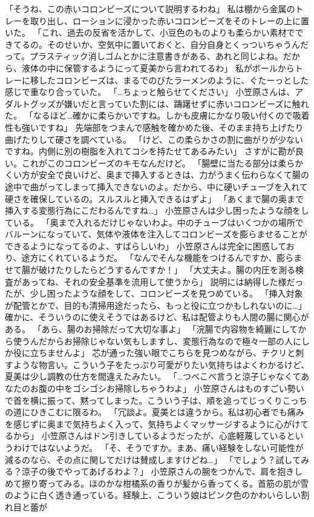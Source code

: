 「そうね、この赤いコロンビーズについて説明するわね」
私は棚から金属のトレーを取り出し、ローションに浸かった赤いコロンビーズをそのトレーの上に置いた。
「これ、過去の反省を活かして、小豆色のものよりも柔らかい素材でできてるの。そのせいか、空気中に置いておくと、自分自身とくっついちゃうんだって。プラスティック消しゴムとかに注意書きがある、あれと同じよね。だから、液体の中に保管するようにって夏美から言われてるわ」
私がボールからトレーに移したコロンビーズは、まるでのびたラーメンのように、ぐたーっとした感じで重なり合っていた。
「…ちょっと触らせてください」
小笠原さんは、アダルトグッズが嫌いだと言っていた割には、躊躇せずに赤いコロンビーズに触れた。
「なるほど…確かに柔らかいですね。しかも皮膚にかなり吸い付くので吸着性も強いですね」
先端部をつまんで感触を確かめた後、そのまま持ち上げたり曲げたりして硬さを調べている。
「けど、この柔らかさの割に曲がりが少ないですね。内側に別の樹脂を入れてコシを持たせてあるみたい」
さすがに勘が良い。これがこのコロンビーズのキモなんだけど。
「腸壁に当たる部分は柔らかくい方が安全で良いけど、奥まで挿入するときは、力がうまく伝わらなくて腸の途中で曲がってしまって挿入できないのよ。だから、中に硬いチューブを入れて硬さを確保しているの。スルスルと挿入できるはずよ」
「あくまで腸の奥まで挿入する変態行為にこだわるんですね…」
小笠原さんは少し困ったような顔をしている。
「奥まで入れるだけじゃないわよ。中のチューブはいくつかの場所でバルーンになっていて、気体や液体を注入してコロンビーズを膨らませることができるようになってるのよ、すばらしいわ」
小笠原さんは完全に困惑しており、途方にくれているようだ。
「なんでそんな機能をつけるんですか、膨らませて腸が破けたりしたらどうするんですか！」
「大丈夫よ。腸の内圧を測る検査があってね、それの安全基準を流用して使うから」
説明には納得した様だったが、少し困ったような顔をして、コロンビーズを見つめている。
「挿入対象が配管とかで、目的も清掃用途だったら、もっと役に立つかもしれないのに…」
確かに、そういうのに使えそうではあるけど、私は配管よりも人間の腸に関心がある。
「あら、腸のお掃除だって大切な事よ」
「浣腸で内容物を綺麗にしてから使うんだからお掃除じゃない気もしますし、変態行為なので極々一部の人にしか役に立ちませんよ」
芯が通った強い眼でこちらを見つめながら、チクリと刺すような物言い。こういう子をたっぷり可愛がりたい気持ちはよくわかるけど、夏美は少し調教の仕方を間違えたみたい。
「…つべこべ言うと涼子じゃなくてあなたのお腹の中をゴシゴシお掃除しちゃうわよ」
小笠原さんはものすごい勢いで首を横に振って、黙ってしまった。こういう子は、順を追ってじっくりこっちの道にひきこむに限るわ。
「冗談よ。夏美とは違うから。私は初心者でも痛みを感じずに奥まで気持ちよく入って、気持ちよくマッサージするように心がけてるから」
小笠原さんはドン引きしているようだったが、心底軽蔑しているというわけではないようだ。
「そ、そうですか。まあ、痛い経験をしない可能性が減るのなら、その点に関してだけは賛成しますけどね…」
「でしょう？試してみる？涼子の後でやってあげるわよ？」
小笠原さんの腕をつかんで、肩を抱きしめて擦り寄ってみる。ほのかな柑橘系の香りが髪から香ってくる。首筋の肌が雪のように白く透き通っている。経験上、こういう娘はピンク色のかわいらしい割れ目と蕾が

